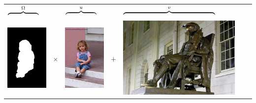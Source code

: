 \documentclass[a4paper]{article}
\begin{document}
  \bigskip
  \begin{tabular}{m{1.6cm}m{.6cm}m{1.6cm}m{.6cm}m{4.7cm}m{.6cm}m{4.7cm}}
    $\overbrace{\hspace{1.6cm}}^{\Omega}$ &&
    $\overbrace{\hspace{1.6cm}}^u$ &&
    $\overbrace{\hspace{4.7cm}}^v$ \\
    \includegraphics[scale=.2]{results_poisson/foreground-mask.png}
    & {\Huge$\times$} &
    \includegraphics[scale=.2]{results_poisson/foreground.png}
    & {\Huge$+$} &
    \includegraphics[scale=.2]{results_poisson/background.png}

\end{tabular}
\end{document}
